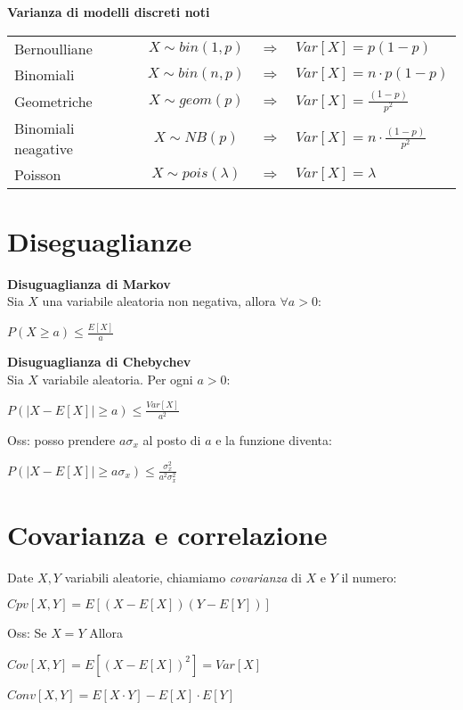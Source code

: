 \documentclass[11pt, letterpaper]{article}
\begin{document}
\textbf{Varianza di modelli discreti noti}\\
\begin{tabular}{l c c l}
   Bernoulliane & $X\sim bin(1,p)$ & $\Rightarrow$ & $Var[X]= p(1-p)$\\
   Binomiali & $X\sim bin(n,p)$ & $\Rightarrow$ & $Var[X]= n\cdot p(1-p)$\\
   Geometriche & $X\sim geom(p)$ & $\Rightarrow$ & $Var[X]= \frac{(1-p)}{p^{2}}$\\
   Binomiali neagative & $X\sim NB(p)$ & $\Rightarrow$ & $Var[X]= n\cdot\frac{(1-p)}{p^{2}}$\\
   Poisson & $X\sim pois(\lambda)$ & $\Rightarrow$ & $Var[X]= \lambda$\\
\end{tabular}

\section{Diseguaglianze}

\textbf{Disuguaglianza di Markov}\\ Sia $X$ una variabile aleatoria non negativa, allora $\forall a>0$:
\begin{center}
    $P(X\geq a) \leq \frac{E[X]}{a}$
\end{center}

\textbf{Disuguaglianza di Chebychev}\\ Sia $X$ variabile aleatoria. Per ogni $a>0$:
\begin{center}
    $P(|X-E[X]|\geq a)\leq \frac{Var[X]}{a^{2}}$
\end{center}

Oss: posso prendere $a\sigma_{x}$ al posto di $a$ e la funzione diventa:
\begin{center}
    $P(|X-E[X]|\geq a\sigma_{x})\leq \frac{\sigma^{2}_{x}}{a^{2}\sigma_{x}^{2}}$
\end{center}

\section{Covarianza e correlazione}
Date $X,Y$ variabili aleatorie, chiamiamo \textit{covarianza} di $X$ e $Y$ il numero:
\begin{center}
    $Cpv[X,Y]=E[(X-E[X])(Y-E[Y])]$
\end{center}

Oss: Se $X=Y$ Allora
\begin{center}
    $Cov[X,Y]=E[(X-E[X])^2]=Var[X]$

    $Conv[X,Y]=E[X\cdot Y]-E[X]\cdot E[Y]$
\end{center}
\end{document}
